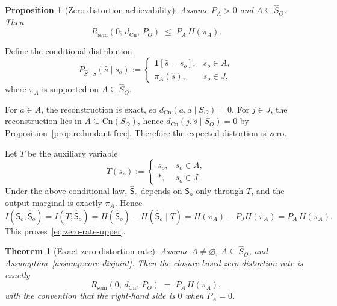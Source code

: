 \documentclass[journal,onecolumn]{IEEEtran}
\makeatletter
\newcommand{\Cn}{\text{Cn}}
\newtheorem{theorem}{Theorem}[section]
\newtheorem{proposition}{Proposition}[section]
\numberwithin{equation}{section}
\renewenvironment{proof}[1][\proofname]{\par
  \pushQED{\qed}%
  \normalfont \topsep6\p@\@plus6\p@\relax
  \trivlist
  \item[\hskip\labelsep
        \itshape
    #1\@addpunct{.}]\ignorespaces
}{%
  \popQED\endtrivlist\@endpefalse
}
\makeatother
\begin{document}
\begin{proposition}[Zero-distortion achievability]
\label{prop:zero-rate-ach}
Assume \(P_A>0\) and \(A\subseteq \hat S_O\). Then
\begin{equation}\label{eq:zero-rate-upper}
  R_{\mathrm{sem}}(0;\,d_{\Cn},\,P_O)
  \;\le\;
  P_A\,H(\pi_A).
\end{equation}
\end{proposition}

\begin{proof}
Define the conditional distribution
\[
  P_{\hat S\mid S}(\hat s\mid s_o)
  :=
  \begin{cases}
    \mathbf{1}[\hat s=s_o], & s_o\in A,\\[3pt]
    \pi_A(\hat s), & s_o\in J,
  \end{cases}
\]
where \(\pi_A\) is supported on \(A\subseteq\hat S_O\).

For \(a\in A\), the reconstruction is exact, so
\(d_{\Cn}(a,a\mid S_O)=0\).
For \(j\in J\), the reconstruction lies in
\(A\subseteq\Cn(S_O)\), hence
\(d_{\Cn}(j,\hat s\mid S_O)=0\) by
Proposition~\ref{prop:redundant-free}.
Therefore the expected distortion is zero.

Let \(T\) be the auxiliary variable
\[
  T(s_o)
  :=
  \begin{cases}
    s_o, & s_o\in A,\\
    *,   & s_o\in J.
  \end{cases}
\]
Under the above conditional law, \(\hat {\mathsf{S}}_o\) depends on \({\mathsf{S}}_o\)
only through \(T\), and the output marginal is exactly \(\pi_A\).
Hence
\[
  I({\mathsf{S}}_o;\hat {\mathsf{S}}_o)
  =I(T;\hat {\mathsf{S}}_o)
  =H(\hat {\mathsf{S}}_o)-H(\hat {\mathsf{S}}_o\mid T)
  =H(\pi_A)-P_J H(\pi_A)
  =P_A\,H(\pi_A).
\]
This proves~\eqref{eq:zero-rate-upper}.
\end{proof}

\begin{theorem}[Exact zero-distortion rate]
\label{thm:tight-zero-rate}
Assume \(A\neq\varnothing\), \(A\subseteq\hat S_O\), and
Assumption~\ref{assump:core-disjoint}.
Then the closure-based zero-distortion rate is exactly
\begin{equation}\label{eq:tight-R0}
  R_{\mathrm{sem}}(0;\,d_{\Cn},\,P_O)
  \;=\;
  P_A\,H(\pi_A),
\end{equation}
with the convention that the right-hand side is \(0\) when \(P_A=0\).
\end{theorem}
\end{document}
